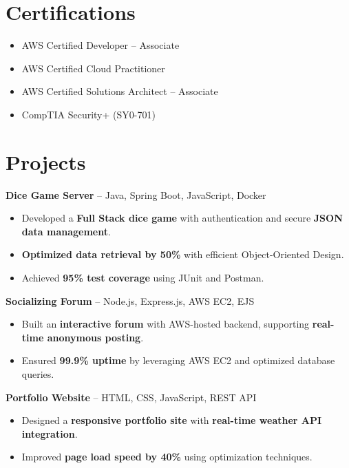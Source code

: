 \documentclass[a4paper,10pt]{article}
\begin{document}
\vspace{-3mm}

\section*{Certifications}
\begin{itemize}[leftmargin=0.3in, itemsep=1pt]
    \item AWS Certified Developer – Associate
    \item AWS Certified Cloud Practitioner
    \item AWS Certified Solutions Architect – Associate
    \item CompTIA Security+ (SY0-701)
\end{itemize}

\vspace{-3mm}

\section*{Projects}
\textbf{Dice Game Server} – Java, Spring Boot, JavaScript, Docker
\begin{itemize}[leftmargin=0.3in, itemsep=1pt]
    \item Developed a \textbf{Full Stack dice game} with authentication and secure \textbf{JSON data management}.
    \item \textbf{Optimized data retrieval by 50\%} with efficient Object-Oriented Design.
    \item Achieved \textbf{95\% test coverage} using JUnit and Postman.
\end{itemize}

\textbf{Socializing Forum} – Node.js, Express.js, AWS EC2, EJS
\begin{itemize}[leftmargin=0.3in, itemsep=1pt]
    \item Built an \textbf{interactive forum} with AWS-hosted backend, supporting \textbf{real-time anonymous posting}.
    \item Ensured \textbf{99.9\% uptime} by leveraging AWS EC2 and optimized database queries.
\end{itemize}

\textbf{Portfolio Website} – HTML, CSS, JavaScript, REST API
\begin{itemize}[leftmargin=0.3in, itemsep=1pt]
    \item Designed a \textbf{responsive portfolio site} with \textbf{real-time weather API integration}.
    \item Improved \textbf{page load speed by 40\%} using optimization techniques.
\end{itemize}
\end{document}
